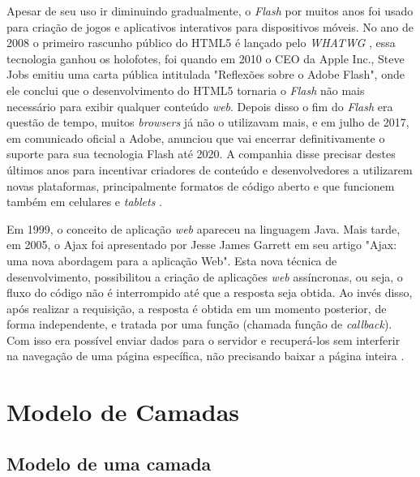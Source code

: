  Apesar de  seu uso ir diminuindo gradualmente, o \textit{Flash} por muitos anos foi usado para criação de jogos e aplicativos interativos para dispositivos móveis. No ano de 2008 o primeiro rascunho público do \ac{HTML}5 é lançado pelo \textit{WHATWG} \cite{fasthosts2018}, essa tecnologia ganhou os holofotes, foi quando em 2010 o CEO da Apple Inc., Steve Jobs emitiu uma carta pública intitulada "Reflexões sobre o Adobe Flash", onde ele conclui que o desenvolvimento do \ac{HTML}5 tornaria o \textit{Flash} não mais necessário para exibir qualquer conteúdo \textit{web}. Depois disso o fim do \textit{Flash} era questão de tempo, muitos \textit{browsers} já não o utilizavam mais, e em julho de 2017, em comunicado oficial a Adobe, anunciou que vai encerrar definitivamente o suporte para sua tecnologia Flash até 2020. A companhia disse precisar destes últimos anos para incentivar criadores de conteúdo e desenvolvedores a utilizarem novas plataformas, principalmente formatos de código aberto e que funcionem também em celulares e \textit{tablets}  \cite{canaltechFlashFim2018}.

Em 1999, o conceito de aplicação \textit{web} apareceu na linguagem Java. Mais tarde, em 2005, o Ajax foi apresentado por Jesse James Garrett em seu artigo "Ajax: uma nova abordagem para a aplicação Web". Esta nova técnica de desenvolvimento, possibilitou a criação de aplicações \textit{web} assíncronas, ou seja, o fluxo do código não é interrompido até que a resposta seja obtida. Ao invés disso, após realizar a requisição, a resposta é obtida em um momento posterior, de forma independente, e tratada por uma função (chamada função de \textit{callback}). Com isso era possível enviar dados para o servidor e recuperá-los sem interferir na navegação de uma página específica, não precisando baixar a página inteira \cite{devmediaAsync2018}.


\section{Modelo de Camadas}
\label{s_c2_figuras}


\subsection{Modelo de uma camada}

